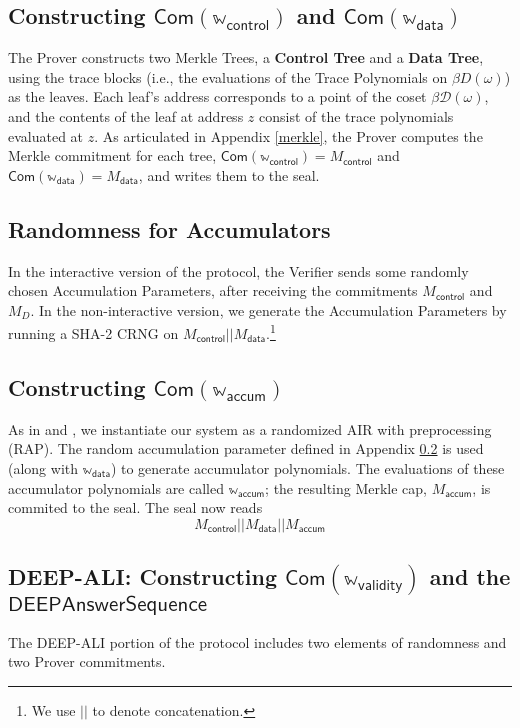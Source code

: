 \documentclass[10pt,letterpaper,titlepage]{article}
\newcommand{\w}[0]{\omega}
\newcommand{\D}[0]{\mathcal{D}}
\theoremstyle{definition}
\begin{document}
\begin{appendices}
\subsection{Constructing $\mathsf{Com}(\mathbb{w}_\mathsf{control})$ and $\mathsf{Com}(\mathbb{w}_\mathsf{data})$}
\label{merkle trace}
The Prover constructs two Merkle Trees, a \textbf{Control Tree} and a \textbf{Data Tree}, using the trace blocks (i.e., the evaluations of the Trace Polynomials on $\beta D(\w)$) as the leaves. 
Each leaf's address corresponds to a point of the coset $\beta\D(\w)$, and the contents of the leaf at address $z$ consist of the trace polynomials evaluated at $z$.
As articulated in Appendix \ref{merkle}, the Prover computes the Merkle commitment for each tree, $\mathsf{Com}(\mathbb{w}_\mathsf{control})=M_\mathsf{control}$ and $\mathsf{Com}(\mathbb{w}_\mathsf{data})=M_\mathsf{data}$, and writes them to the seal. 

\subsection{Randomness for Accumulators}
\label{accum randomness}
In the interactive version of the protocol, the Verifier sends some randomly chosen Accumulation Parameters, after receiving the commitments $M_\mathsf{control}$ and $M_{D}$. 
In the non-interactive version, we generate the Accumulation Parameters by running a SHA-2 CRNG on $M_\mathsf{control}||M_\mathsf{data}$.\footnote{We use $||$ to denote concatenation.}

\subsection{Constructing $\mathsf{Com}(\mathbb{w}_\mathsf{accum})$ }
\label{committing accum}
As in \cite{cairo} and \cite{RAP}, we instantiate our system as a randomized AIR with preprocessing (RAP). 
The random accumulation parameter defined in Appendix \ref{accum randomness} is used (along with $\mathbb{w}_\mathsf{data}$) to generate accumulator polynomials.
The evaluations of these accumulator polynomials are called $\mathbb{w}_\mathsf{accum}$; the resulting Merkle cap, $M_\mathsf{accum}$, is commited to the seal. 
The seal now reads
\[
  M_\mathsf{control}||
  M_\mathsf{data}||
  M_\mathsf{accum}
\]

\subsection{DEEP-ALI: Constructing $\mathsf{Com}(\mathbb{w}_\mathsf{validity})$ and the $\mathsf{DEEPAnswerSequence}$}
The DEEP-ALI portion of the protocol includes two elements of randomness and two Prover commitments. 

\end{appendices}
\end{document}
